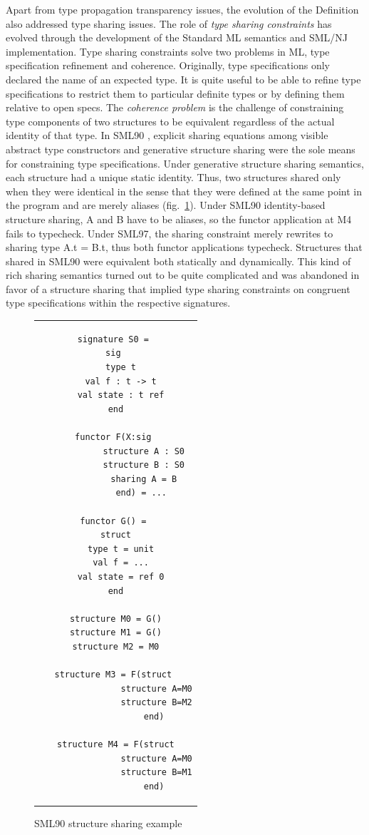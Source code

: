 Apart from type propagation transparency issues, the evolution of the Definition also addressed type sharing issues. The role of \emph{type sharing constraints} has evolved through the development of the Standard ML semantics and SML/NJ implementation. Type sharing constraints solve two problems in ML, type specification refinement and coherence. Originally, type specifications only declared the name of an expected type. It is quite useful to be able to refine type specifications to restrict them to particular definite types or by defining them relative to open specs. The \emph{coherence problem} is the challenge of constraining type components of two structures to be equivalent regardless of the actual identity of that type. In SML90 \cite{mth90}, explicit sharing equations among visible abstract type constructors and generative structure sharing were the sole means for constraining type specifications. Under generative structure sharing semantics, each structure had a unique static identity. Thus, two structures shared only when they were identical in the sense that they were defined at the same point in the program and are merely aliases (fig.~\ref{fig:structuresharing}). Under SML90 identity-based structure sharing, A and B have to be aliases, so the functor application at M4 fails to typecheck. Under SML97, the sharing constraint merely rewrites to sharing type A.t = B.t, thus both functor applications typecheck.
  Structures that shared in SML90 were equivalent both statically and dynamically. This kind of rich sharing semantics turned out to be quite complicated and was abandoned in favor of a structure sharing that implied type sharing constraints on congruent type specifications within the respective signatures. 

\begin{figure}
\begin{center}
\begin{tabular}{c}
\begin{lstlisting}
signature S0 = 
sig 
  type t
  val f : t -> t
  val state : t ref
end

functor F(X:sig 
           structure A : S0
           structure B : S0
           sharing A = B
          end) = ...

functor G() = 
struct
  type t = unit
  val f = ...
  val state = ref 0
end

structure M0 = G()
structure M1 = G()
structure M2 = M0

structure M3 = F(struct 
                structure A=M0
                structure B=M2
               end)

structure M4 = F(struct
                structure A=M0
                structure B=M1
               end)
\end{lstlisting}
\end{tabular}
\end{center}
\caption{SML90 structure sharing example}
\label{fig:structuresharing}
\end{figure}

